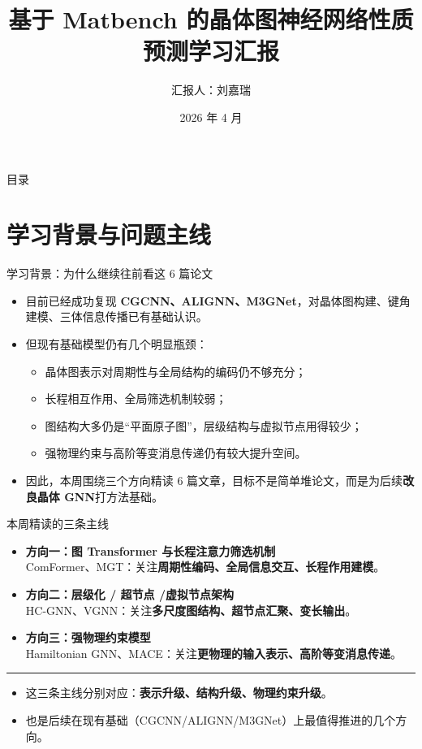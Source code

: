 \documentclass{beamer}
\title[Matbench 晶体性质预测学习汇报]{基于 Matbench 的晶体图神经网络性质预测学习汇报}
\author[刘嘉瑞]{汇报人：刘嘉瑞}
\institute[学习报告]{本周文献精读：ComFormer / MGT / HC-GNN / VGNN / Hamiltonian GNN / MACE}
\date{2026 年 4 月}
\begin{document}
\begin{frame}
 \titlepage
\end{frame}

\begin{frame}{目录}
 \tableofcontents
\end{frame}

\section{学习背景与问题主线}

\begin{frame}{学习背景：为什么继续往前看这 6 篇论文}
\begin{itemize}
  \item 目前已经成功复现 \textbf{CGCNN、ALIGNN、M3GNet}，对晶体图构建、键角建模、三体信息传播已有基础认识。
  \item 但现有基础模型仍有几个明显瓶颈：
  \begin{itemize}
    \item 晶体图表示对周期性与全局结构的编码仍不够充分；
    \item 长程相互作用、全局筛选机制较弱；
    \item 图结构大多仍是“平面原子图”，层级结构与虚拟节点用得较少；
    \item 强物理约束与高阶等变消息传递仍有较大提升空间。
  \end{itemize}
  \item 因此，本周围绕三个方向精读 6 篇文章，目标不是简单堆论文，而是为后续\textbf{改良晶体 GNN}打方法基础。
\end{itemize}
\end{frame}

\begin{frame}{本周精读的三条主线}
\begin{itemize}
  \item \textbf{方向一：图 Transformer 与长程注意力筛选机制}\\
        ComFormer、MGT：关注\textbf{周期性编码、全局信息交互、长程作用建模}。
  \vspace{1.5mm}
  \item \textbf{方向二：层级化 / 超节点 /虚拟节点架构}\\
        HC-GNN、VGNN：关注\textbf{多尺度图结构、超节点汇聚、变长输出}。
  \vspace{1.5mm}
  \item \textbf{方向三：强物理约束模型}\\
        Hamiltonian GNN、MACE：关注\textbf{更物理的输入表示、高阶等变消息传递}。
\end{itemize}

\vspace{2mm}
\hrule
\vspace{2mm}

\begin{itemize}
  \item 这三条主线分别对应：\textbf{表示升级、结构升级、物理约束升级}。
  \item 也是后续在现有基础（CGCNN/ALIGNN/M3GNet）上最值得推进的几个方向。
\end{itemize}
\end{frame}
\end{document}
